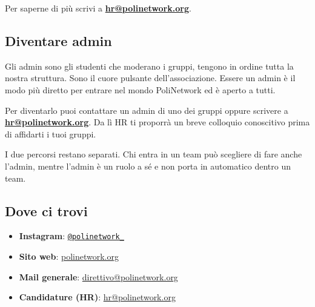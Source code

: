 \documentclass[legal]{polinetwork}
\begin{document}
Per saperne di più scrivi a \textbf{\href{mailto:hr@polinetwork.org}{hr@polinetwork.org}}.

\subsection{Diventare admin}


Gli admin sono gli studenti che moderano i gruppi, tengono in ordine tutta la nostra struttura. Sono il cuore pulsante dell'associazione. Essere un admin è il modo più diretto per entrare nel mondo PoliNetwork ed è aperto a tutti.

Per diventarlo puoi contattare un admin di uno dei gruppi oppure scrivere a \textbf{\href{mailto:hr@polinetwork.org}{hr@polinetwork.org}}. Da lì HR ti proporrà un breve colloquio conoscitivo prima di affidarti i tuoi gruppi.

I due percorsi restano separati. Chi entra in un team può scegliere di fare anche l'admin, mentre l'admin è un ruolo a sé e non porta in automatico dentro un team.

\subsection{Dove ci trovi}


\begin{itemize}
  \item \textbf{Instagram}: \href{https://instagram.com/polinetwork\_}{\texttt{@polinetwork\_}}
  \item \textbf{Sito web}: \href{https://polinetwork.org}{polinetwork.org}
  \item \textbf{Mail generale}: \href{mailto:direttivo@polinetwork.org}{direttivo@polinetwork.org}
  \item \textbf{Candidature (HR)}: \href{mailto:hr@polinetwork.org}{hr@polinetwork.org}
\end{itemize}
\end{document}
